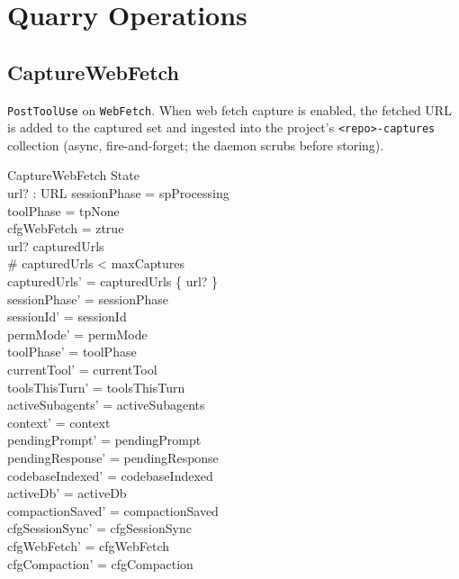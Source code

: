 \documentclass[a4paper,10pt,fleqn]{article}
\begin{document}
\section{Quarry Operations}

\subsection{CaptureWebFetch}

\texttt{PostToolUse} on \texttt{WebFetch}. When web fetch capture
is enabled, the fetched URL is added to the captured set and
ingested into the project's \texttt{<repo>-captures} collection
(async, fire-and-forget; the daemon scrubs before storing).

\begin{schema}{CaptureWebFetch}
  \Delta State \\
  url? : URL
  \where
  sessionPhase = spProcessing \\
  toolPhase = tpNone \\
  cfgWebFetch = ztrue \\
  url? \notin capturedUrls \\
  \# capturedUrls < maxCaptures \\
  capturedUrls' = capturedUrls \cup \{ url? \} \\
  sessionPhase' = sessionPhase \\
  sessionId' = sessionId \\
  permMode' = permMode \\
  toolPhase' = toolPhase \\
  currentTool' = currentTool \\
  toolsThisTurn' = toolsThisTurn \\
  activeSubagents' = activeSubagents \\
  context' = context \\
  pendingPrompt' = pendingPrompt \\
  pendingResponse' = pendingResponse \\
  codebaseIndexed' = codebaseIndexed \\
  activeDb' = activeDb \\
  compactionSaved' = compactionSaved \\
  cfgSessionSync' = cfgSessionSync \\
  cfgWebFetch' = cfgWebFetch \\
  cfgCompaction' = cfgCompaction
\end{schema}
\end{document}
